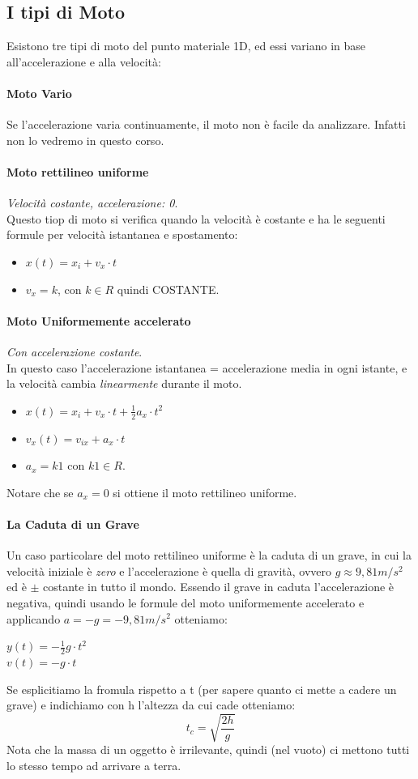 \documentclass[12pt, a4paper, openany]{book}
\begin{document}
\subsection{I tipi di Moto}
Esistono tre tipi di moto del punto materiale 1D, ed essi variano in base all'accelerazione e alla velocità:
\paragraph*{Moto Vario} Se l'accelerazione varia continuamente, il moto non è facile da analizzare. Infatti non lo vedremo in questo corso.
\paragraph*{Moto rettilineo uniforme}\emph{Velocità costante, accelerazione: 0}.
\\Questo tiop di moto si verifica quando la velocità è costante e ha le seguenti formule per velocità istantanea e spostamento:
\begin{itemize}
    \item $x(t)= x_i + v_x \cdot t$
    \item $v_x = k$, con $k\in R$ quindi COSTANTE.
\end{itemize}
\paragraph*{Moto Uniformemente accelerato} \emph{Con accelerazione costante}.
\\In questo caso l'accelerazione istantanea = accelerazione media in ogni istante, e la velocità cambia \emph{linearmente} durante il moto.
\begin{itemize}
    \item $x(t) = x_i + v_x\cdot t +\frac{1}{2} a_x \cdot t^2$
    \item $v_x(t) = v_{ix} + a_x \cdot t$
    \item $a_x = k1$ con $k1 \in R$.
\end{itemize}
Notare che se $a_x=0$ si ottiene il moto rettilineo uniforme.

\paragraph*{La Caduta di un Grave}
Un caso particolare del moto rettilineo uniforme è la caduta di un grave, in cui la velocità iniziale è \emph{zero} e
l'accelerazione è quella di gravità, ovvero $g\approx 9,81m/s^2$ ed è $\pm$ costante in tutto il mondo.
Essendo il grave in caduta l'accelerazione è negativa, quindi usando le formule del moto uniformemente accelerato e applicando $a=-g=-9,81m/s^2$ otteniamo:
\begin{center} %
    $y(t)=-\frac{1}{2} g\cdot t^2$\\$ v(t) = -g \cdot t$
\end{center}
Se esplicitiamo la fromula rispetto a t (per sapere quanto ci mette a cadere un grave) e indichiamo con h l'altezza da cui cade otteniamo:
$$t_c =\sqrt{\frac{2h}{g}}$$
Nota che la massa di un oggetto è irrilevante, quindi (nel vuoto) ci mettono tutti lo stesso tempo ad arrivare a terra.
\end{document}
